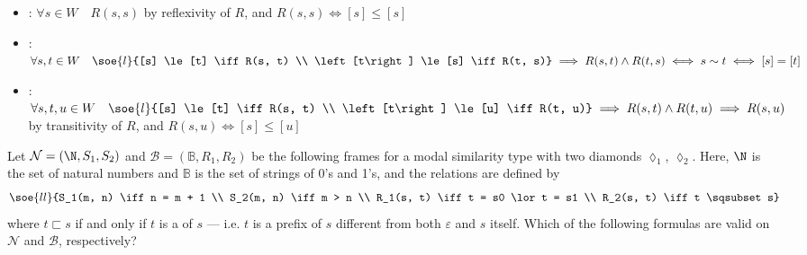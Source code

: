 \documentclass[a4paper, 12pt]{report}
\begin{document}
{\begin{enumerate}[label=(\alph*)]
                \begin{itemize}
                    \item {}: $\forall s \in W \quad R(s, s)$ by reflexivity of $R$, and $R(s, s) \iff [s] \le [s]$
                    \item {}: $\forall s, t \in W \quad \soe{l}{[s] \le [t] \iff R(s, t) \\ \left[t\right] \le [s] \iff R(t, s)} \implies R(s, t) \land R(t, s) \iff s \sim t \iff [s] = [t]$
                    \item {}: $\forall s, t, u \in W \quad \soe{l}{[s] \le [t] \iff R(s, t) \\  \left[t\right] \le [u] \iff R(t, u)} \implies R(s, t) \land R(t, u)\implies R(s, u)$ by transitivity of $R$, and $R(s, u) \iff [s] \le [u]$
                \end{itemize}
        \end{enumerate}
    }

     Let $\mathcal N = (\N, S_1, S_2)$ and $\mathcal B = (\mathbb B, R_1, R_2)$ be the following frames for a modal similarity type with two diamonds $\lozenge_1$, $\lozenge_2$. Here, $\N$ is the set of natural numbers and $\mathbb B$ is the set of strings of 0's and 1's, and the relations are defined by $$\soe{ll}{S_1(m, n) \iff n = m + 1 \\ S_2(m, n) \iff m > n \\ R_1(s, t) \iff t = s0 \lor t = s1 \\ R_2(s, t) \iff t \sqsubset s}$$ where $t \sqsubset s$ if and only if $t$ is a  of $s$ --- i.e. $t$ is a prefix of $s$ different from both $\varepsilon$ and $s$ itself. Which of the following formulas are valid on $\mathcal N$ and $\mathcal B$, respectively?
\end{document}
